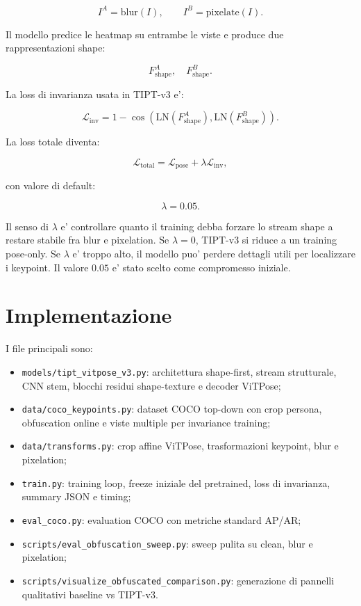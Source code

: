 \documentclass[11pt,a4paper]{article}
\newcommand{\code}[1]{\texttt{#1}}
\newcommand{\tipt}{TIPT-v3}
\begin{document}
\[
  I^A = \mathrm{blur}(I), \qquad
  I^B = \mathrm{pixelate}(I).
\]

Il modello predice le heatmap su entrambe le viste e produce due rappresentazioni
shape:

\[
  F_{\mathrm{shape}}^A, \quad F_{\mathrm{shape}}^B.
\]

La loss di invarianza usata in \tipt{} e':

\[
  \mathcal{L}_{\mathrm{inv}} =
  1 -
  \cos\left(
    \mathrm{LN}(F_{\mathrm{shape}}^A),
    \mathrm{LN}(F_{\mathrm{shape}}^B)
  \right).
\]

La loss totale diventa:

\[
  \mathcal{L}_{\mathrm{total}} =
  \mathcal{L}_{\mathrm{pose}} +
  \lambda \mathcal{L}_{\mathrm{inv}},
\]

con valore di default:

\[
  \lambda = 0.05.
\]

Il senso di $\lambda$ e' controllare quanto il training debba forzare lo stream
shape a restare stabile fra blur e pixelation. Se $\lambda=0$, \tipt{} si riduce
a un training pose-only. Se $\lambda$ e' troppo alto, il modello puo' perdere
dettagli utili per localizzare i keypoint. Il valore $0.05$ e' stato scelto come
compromesso iniziale.

\section{Implementazione}

I file principali sono:

\begin{itemize}[leftmargin=1.2em]
  \item \code{models/tipt\_vitpose\_v3.py}: architettura shape-first, stream
  strutturale, CNN stem, blocchi residui shape-texture e decoder ViTPose;
  \item \code{data/coco\_keypoints.py}: dataset COCO top-down con crop persona,
  obfuscation online e viste multiple per invariance training;
  \item \code{data/transforms.py}: crop affine ViTPose, trasformazioni keypoint,
  blur e pixelation;
  \item \code{train.py}: training loop, freeze iniziale del pretrained, loss di
  invarianza, summary JSON e timing;
  \item \code{eval\_coco.py}: evaluation COCO con metriche standard AP/AR;
  \item \code{scripts/eval\_obfuscation\_sweep.py}: sweep pulita su clean, blur
  e pixelation;
  \item \code{scripts/visualize\_obfuscated\_comparison.py}: generazione di
  pannelli qualitativi baseline vs \tipt{}.
\end{itemize}
\end{document}
